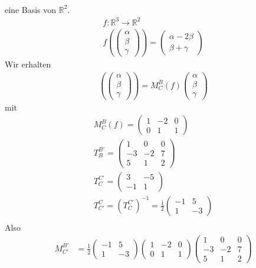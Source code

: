 \documentclass[11pt]{report}
\newcommand*\Zb[1] {\mathbb{#1}}
\begin{document}
\begin{itemize}
\begin{align}
\end{align}
eine Basis von $\Zb{R}^2$.
\begin{align}
f: \Zb{R}^3 \rightarrow \Zb{R}^2 \\
f\left( \begin{pmatrix} \alpha \\  \beta \\ \gamma \end{pmatrix}\right) = \begin{pmatrix} \alpha-2\beta \\ \beta + \gamma\end{pmatrix}
\end{align}
Wir erhalten 
\begin{align}
\left( \begin{pmatrix} \alpha \\  \beta \\ \gamma \end{pmatrix}\right) = M_{C}^{B}(f) \begin{pmatrix} \alpha \\  \beta \\ \gamma \end{pmatrix}
\end{align}
mit
\begin{align}
M_{C}^{B}(f) = \begin{pmatrix} 1 & -2 & 0 \\ 0 & 1 & 1\end{pmatrix} \\
T_{B}^{B'} = \begin{pmatrix} 1 & 0 & 0 \\ -3 & -2 & 7 \\ 5 & 1 & 2\end{pmatrix} \\
T_{C}^{C'} = \begin{pmatrix} 3 & -5 \\ -1 & 1 \end{pmatrix} \\
T_{C'}^{C} = \left( T_{C}^{C'}\right)^{-1} = \frac{1}{2} \begin{pmatrix} -1 & 5 \\ 1 & -3 \end{pmatrix} \\
\end{align}
Also 
\begin{align}
M_{C'}^{B'} &= \frac{1}{2} \begin{pmatrix} -1 & 5 \\ 1 & -3 \end{pmatrix} \begin{pmatrix} 1 & -2 & 0 \\ 0 & 1 & 1\end{pmatrix} \begin{pmatrix} 1 & 0 & 0 \\ -3 & -2 & 7 \\ 5 & 1 & 2\end{pmatrix} \\

\end{align}
\end{itemize}
\end{document}
